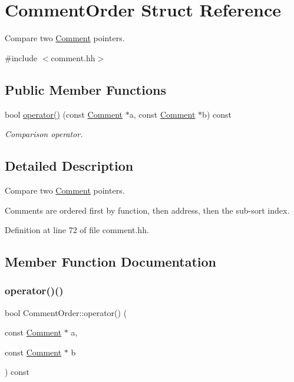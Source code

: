\hypertarget{struct_comment_order}{}\section{Comment\+Order Struct Reference}
\label{struct_comment_order}


Compare two \mbox{\hyperlink{class_comment}{Comment}} pointers.  




{\ttfamily \#include $<$comment.\+hh$>$}

\subsection*{Public Member Functions}
\begin{DoxyCompactItemize}
\item 
bool \mbox{\hyperlink{struct_comment_order_abc25c16ce85b2992b4218788df3732f7}{operator()}} (const \mbox{\hyperlink{class_comment}{Comment}} $\ast$a, const \mbox{\hyperlink{class_comment}{Comment}} $\ast$b) const
\begin{DoxyCompactList}\small\item\em Comparison operator. \end{DoxyCompactList}\end{DoxyCompactItemize}


\subsection{Detailed Description}
Compare two \mbox{\hyperlink{class_comment}{Comment}} pointers. 

Comments are ordered first by function, then address, then the sub-\/sort index. 

Definition at line 72 of file comment.\+hh.



\subsection{Member Function Documentation}
\mbox{\label{struct_comment_order_abc25c16ce85b2992b4218788df3732f7}} 
\subsubsection{\texorpdfstring{operator()()}{operator()()}}
{\footnotesize\ttfamily bool Comment\+Order\+::operator() (\begin{DoxyParamCaption}\item[{const \mbox{\hyperlink{class_comment}{Comment}} $\ast$}]{a,  }\item[{const \mbox{\hyperlink{class_comment}{Comment}} $\ast$}]{b }\end{DoxyParamCaption}) const}




